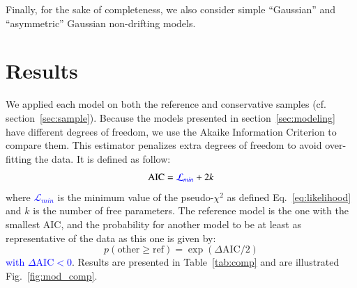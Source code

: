 \documentclass[]{aa} %
\newcommand{\nn}[1]{{\textcolor[rgb]{1, 0.27, 0}{#1}}}
\newcommand{\yc}[1]{{\textcolor{blue}{#1}}}
\begin{document}
Finally, for the sake of completeness, we also
consider simple ``Gaussian'' %
and ``asymmetric'' Gaussian %
non-drifting models. 


\section{Results}
\label{sec:results}

We applied each model on both the reference and conservative samples (cf.
section~\ref{sec:sample}). Because the models presented
in section~\ref{sec:modeling} have different degrees of freedom, we use the Akaike
Information Criterion \citep[AIC, e.g.][]{burnham2004} to compare them. This estimator
penalizes extra degrees of freedom to avoid over-fitting the data. It is defined
as follow:
\begin{equation}
    \mathrm{AIC} = \yc{\mathcal{L}_{min}} + 2k
\end{equation}
where \yc{$\mathcal{L}_{min}$} is
the minimum value of the pseudo-$\chi^2$ as defined Eq.~\eqref{eq:likelihood} and $k$ is the number of free parameters. The \nn{reference} model
is the one with the smallest AIC, and the probability for another model to be at
least as representative of the data as this one is given by:
\begin{equation}
    p(\mathrm{other} \geq \mathrm{ref}) =
    \exp\left(\Delta\mathrm{AIC}/2\right)
\end{equation}
\yc{with $\Delta\mathrm{AIC} < 0$}. Results are presented in Table~\ref{tab:comp} and are illustrated
Fig.~\ref{fig:mod_comp}.
\end{document}
